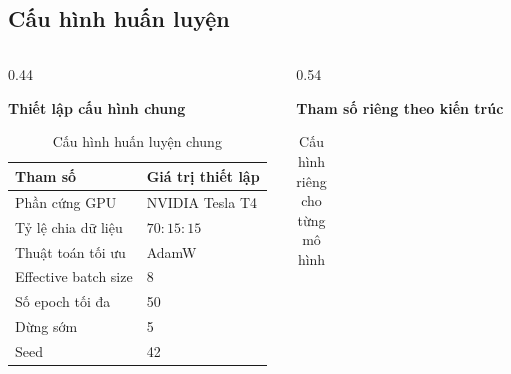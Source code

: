 \subsection{Cấu hình huấn luyện}
\begin{frame}
    \begin{columns}[T]
        \begin{column}{0.44\textwidth}
            \justifying
            \centerline{\textbf{Thiết lập cấu hình chung}}
            \vspace{0.2cm}
            \begin{table}[h]
                \centering
                \caption{Cấu hình huấn luyện chung}
                \label{tab:slide_common_train}
                \footnotesize
                \setlength{\tabcolsep}{4pt}
                \begin{tabular}{ll}
                    \toprule
                    Tham số              & Giá trị thiết lập \\
                    \midrule
                    Phần cứng GPU        & NVIDIA Tesla T4   \\
                    Tỷ lệ chia dữ liệu   & $70:15:15$        \\
                    Thuật toán tối ưu    & AdamW             \\
                    Effective batch size & 8                 \\
                    Số epoch tối đa      & 50                \\
                    Dừng sớm             & 5                 \\
                    Seed                 & 42              \\
                    \bottomrule
                \end{tabular}
            \end{table}
        \end{column}
        \begin{column}{0.54\textwidth}
            \justifying
            \centerline{\textbf{Tham số riêng theo kiến trúc}}
            \vspace{0.2cm}
            \begin{table}[h]
                \centering
                \caption{Cấu hình riêng cho từng mô hình}
                \label{tab:slide_specific_train}
                \scriptsize
                \setlength{\tabcolsep}{3pt}
                \begin{tabular}{lrrp{2.6cm}}
                    \toprule

\end{tabular}
\end{table}
\end{column}
\end{columns}
\end{frame}
